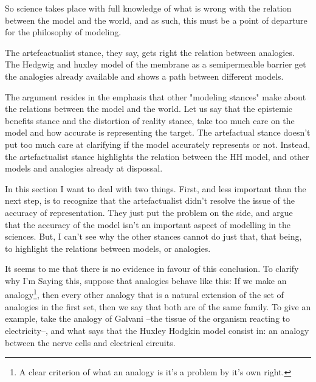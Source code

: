 So science takes place with full knowledge of what is wrong with the relation between the model and the world, and as such, this must be a point of departure for the philosophy of modeling.




The artefeactualist stance, they say, gets right the relation between analogies.
The Hedgwig and huxley model of the membrane as a semipermeable barrier get the analogies already available and shows a path between different models.

The argument resides in the emphasis that other "modeling stances" make about the relations between the model and the world.
Let us say that the epistemic benefits stance and the distortion of reality stance, take too much care on the model and how accurate is representing the target.
The artefactual stance doesn't put too much care at clarifying if the model accurately represents or not.
Instead, the artefactualist stance highlights the relation between the HH model, and other models and analogies already at dispossal.

In this section I want to deal with two things.
First, and less important than the next step, is to recognize that the artefactualist didn't resolve the issue of the accuracy of representation.
They just put the problem on the side, and argue that the accuracy of the model isn't an important aspect of modelling in the sciences.
But, I can't see why the other stances cannot do just that, that being, to highlight the relations between models, or analogies.

It seems to me that there is no evidence in favour of this conclusion.
To clarify why I'm Saying this, suppose that analogies behave like this: If we make an analogy\footnote{A clear criterion of what an analogy is it's a problem by it's own right. }, then every other analogy that is a natural extension of the set of analogies in the first set, then we say that both are of the same family.
To give an example, take the analogy of Galvani --the tissue of the organism reacting to electricity--, and what \cite{Carrillo2021-CARAAP-12} says that the Huxley Hodgkin model consist in: an analogy between the nerve cells and electrical circuits.



